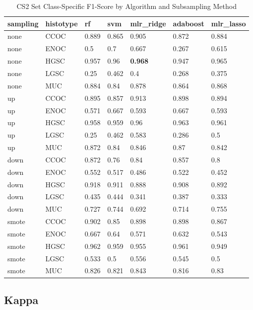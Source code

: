 \documentclass[
]{report}
\begin{document}
\begin{table}

\caption{\label{tab:cs2-f1-class-table}CS2 Set Class-Specific F1-Score by Algorithm and Subsampling Method}
\centering
\begin{tabular}[t]{l|l|l|l|l|l|l}
\hline
sampling & histotype & rf & svm & mlr\_ridge & adaboost & mlr\_lasso\\
\hline
none & CCOC & 0.889 & 0.865 & 0.905 & 0.872 & 0.884\\
\hline
none & ENOC & 0.5 & 0.7 & 0.667 & 0.267 & 0.615\\
\hline
none & HGSC & 0.957 & 0.96 & \textbf{0.968} & 0.947 & 0.965\\
\hline
none & LGSC & 0.25 & 0.462 & 0.4 & 0.268 & 0.375\\
\hline
none & MUC & 0.884 & 0.84 & 0.878 & 0.864 & 0.868\\
\hline
up & CCOC & 0.895 & 0.857 & 0.913 & 0.898 & 0.894\\
\hline
up & ENOC & 0.571 & 0.667 & 0.593 & 0.667 & 0.593\\
\hline
up & HGSC & 0.958 & 0.959 & 0.96 & 0.963 & 0.961\\
\hline
up & LGSC & 0.25 & 0.462 & 0.583 & 0.286 & 0.5\\
\hline
up & MUC & 0.872 & 0.84 & 0.846 & 0.87 & 0.842\\
\hline
down & CCOC & 0.872 & 0.76 & 0.84 & 0.857 & 0.8\\
\hline
down & ENOC & 0.552 & 0.517 & 0.486 & 0.522 & 0.452\\
\hline
down & HGSC & 0.918 & 0.911 & 0.888 & 0.908 & 0.892\\
\hline
down & LGSC & 0.435 & 0.444 & 0.341 & 0.387 & 0.333\\
\hline
down & MUC & 0.727 & 0.744 & 0.692 & 0.714 & 0.755\\
\hline
smote & CCOC & 0.902 & 0.85 & 0.898 & 0.898 & 0.867\\
\hline
smote & ENOC & 0.667 & 0.64 & 0.571 & 0.632 & 0.543\\
\hline
smote & HGSC & 0.962 & 0.959 & 0.955 & 0.961 & 0.949\\
\hline
smote & LGSC & 0.533 & 0.5 & 0.556 & 0.545 & 0.5\\
\hline
smote & MUC & 0.826 & 0.821 & 0.843 & 0.816 & 0.83\\
\hline
\end{tabular}
\end{table}

\hypertarget{kappa-3}{%
\subsection{Kappa}\label{kappa-3}}
\end{document}
